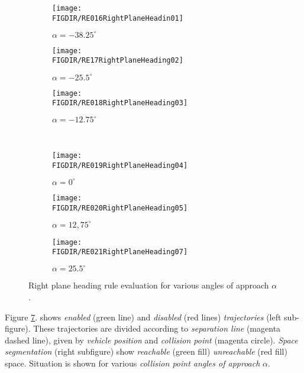 \begin{figure}[H]
	\centering
    \begin{subfigure}{0.32\textwidth}
    	\centering
        \texttt{[image: \\FIGDIR/RE016RightPlaneHeadin01]} 
        \caption{$\alpha=-38.25^\circ$}
        \label{fig:ruleRightPlaneHeading01}
    \end{subfigure}
    \begin{subfigure}{0.32\textwidth}
    	\centering
        \texttt{[image: \\FIGDIR/RE17RightPlaneHeading02]} 
        \caption{$\alpha=-25.5^\circ$}
        \label{fig:ruleRightPlaneHeading02}
    \end{subfigure}
    \begin{subfigure}{0.32\textwidth}
    	\centering
        \texttt{[image: \\FIGDIR/RE018RightPlaneHeading03]} 
        \caption{$\alpha=-12.75^\circ$}
        \label{fig:ruleRightPlaneHeading03}
    \end{subfigure}
    \\
    \begin{subfigure}{0.32\textwidth}
    	\centering
        \texttt{[image: \\FIGDIR/RE019RightPlaneHeading04]} 
        \caption{$\alpha=0^\circ$}
        \label{fig:ruleRightPlaneHeading04}
    \end{subfigure}
    \begin{subfigure}{0.32\textwidth}
    	\centering
        \texttt{[image: \\FIGDIR/RE020RightPlaneHeading05]} 
        \caption{$\alpha=12,75^\circ$}
        \label{fig:ruleRightPlaneHeading05}
    \end{subfigure}
    \begin{subfigure}{0.32\textwidth}
    	\centering
        \texttt{[image: \\FIGDIR/RE021RightPlaneHeading07]} 
        \caption{$\alpha=25.5^\circ$}
        \label{fig:ruleRightPlaneHeading06}
    \end{subfigure}
    \caption{Right plane heading rule evaluation for various angles of approach $\alpha$.}        
    \label{fig:ruleRightPlaneHeadingGeneral}
\end{figure}

\noindent Figure \ref{fig:ruleRightPlaneHeadingGeneral}. shows \emph{enabled} (green line) and \emph{disabled} (red lines) \emph{trajectories} (left sub-figure). These trajectories are divided according to \emph{separation line} (magenta dashed line), given by \emph{vehicle position} and \emph{collision point} (magenta circle). \emph{Space segmentation} (right subfigure) show \emph{reachable} (green fill) \emph{unreachable} (red fill) space. Situation is shown for various \emph{collision point angles of approach} $\alpha$.

